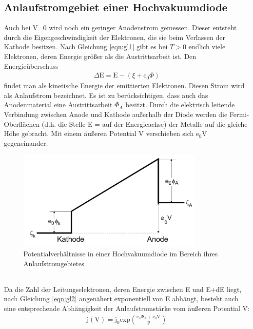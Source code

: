 \subsection{Anlaufstromgebiet einer Hochvakuumdiode}
Auch bei V=0 wird noch ein geringer Anodenstrom gemessen.
Dieser entsteht durch die Eigengeschwindigkeit der Elektronen, die sie beim Verlassen der Kathode besitzen.
Nach Gleichung \eqref{eqn:gl1} gibt es bei $T>0$ endlich viele Elektronen, deren Energie größer als die Austrittsarbeit ist.
Den Energieüberschuss
\begin{align*}
    \Delta \text{E} = \text{E} - \left(\xi + \text{e}_0 \Phi \right)
\end{align*}
findet man als kinetische Energie der emittierten Elektronen.
Diesen Strom wird als Anlaufstrom bezeichnet.
Es ist zu berücksichtigen, dass auch das Anodenmaterial eine Austrittsarbeit $\Phi_A$ besitzt.
Durch die elektrisch leitende Verbindung zwischen Anode und Kathode außerhalb der Diode werden die Fermi-Oberflächen (d.h. die Stelle E = \xi auf der Energieachse) der Metalle auf die gleiche Höhe gebracht.
Mit einem äußeren Potential V verschieben sich $\text{e}_0 \text{V}$ gegeneinander.
\begin{figure}
    \centering
    \includegraphics[height=5.0cm]{data/abb5.jpg}
    \caption{Potentialverhältnisse in einer Hochvakuumdiode im Bereich ihres Anlaufstromgebietes  \cite{V504}}
    \label{fig:abb5}
\end{figure} \\
\noindent
Da die Zahl der Leitungselektronen, deren Energie zwischen E und E+dE liegt, nach Gleichung \ref{eqn:gl2} angenähert exponentiell von E abhängt, besteht auch eine entsprechende Abhängigkeit der Anlaufstromstärke vom äußeren Potential V:
\begin{align*}
    \text{j}(\text{V}) = \text{j}_0 \text{exp} \left(\frac{\text{e}_0 \Phi_A + \text{e}_0 \text{V}}{y}\right)
\end{align*}

